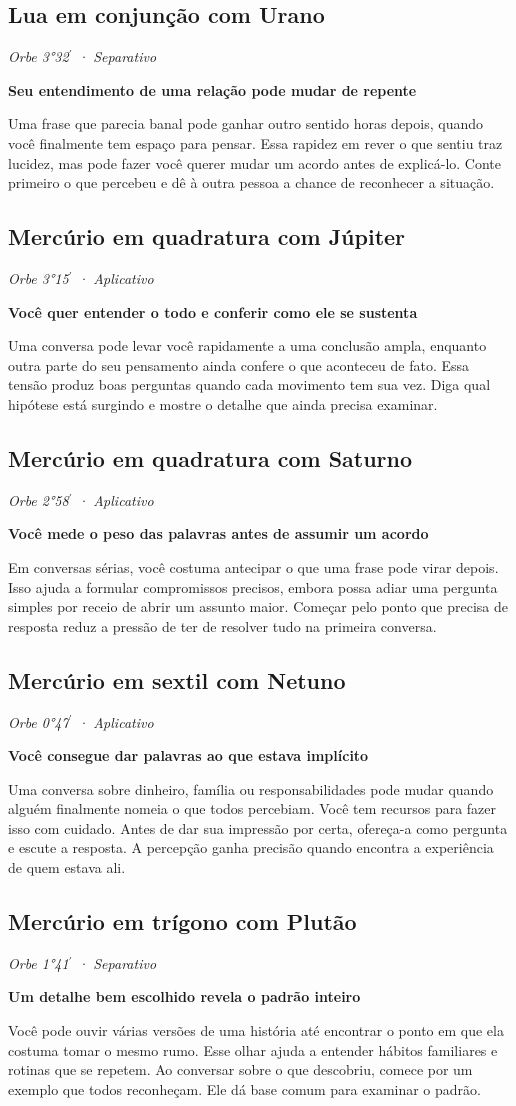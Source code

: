 \documentclass[11pt,a4paper]{article}
\newcommand{\leitura}[3]{\subsection{#1}\textit{#2}\par #3}
\newcommand{\subtituloleitura}[1]{\textbf{#1}\par\nopagebreak[4]}
\begin{document}
\leitura{Lua em conjunção com Urano}{Orbe 3°32\ensuremath{^{\prime}} · Separativo}{
\subtituloleitura{Seu entendimento de uma relação pode mudar de repente}
Uma frase que parecia banal pode ganhar outro sentido horas depois, quando você finalmente tem espaço para pensar. Essa rapidez em rever o que sentiu traz lucidez, mas pode fazer você querer mudar um acordo antes de explicá-lo. Conte primeiro o que percebeu e dê à outra pessoa a chance de reconhecer a situação.
}

\leitura{Mercúrio em quadratura com Júpiter}{Orbe 3°15\ensuremath{^{\prime}} · Aplicativo}{
\label{aspecto:mercurio-jupiter}\subtituloleitura{Você quer entender o todo e conferir como ele se sustenta}
Uma conversa pode levar você rapidamente a uma conclusão ampla, enquanto outra parte do seu pensamento ainda confere o que aconteceu de fato. Essa tensão produz boas perguntas quando cada movimento tem sua vez. Diga qual hipótese está surgindo e mostre o detalhe que ainda precisa examinar.
}

\leitura{Mercúrio em quadratura com Saturno}{Orbe 2°58\ensuremath{^{\prime}} · Aplicativo}{
\subtituloleitura{Você mede o peso das palavras antes de assumir um acordo}
Em conversas sérias, você costuma antecipar o que uma frase pode virar depois. Isso ajuda a formular compromissos precisos, embora possa adiar uma pergunta simples por receio de abrir um assunto maior. Começar pelo ponto que precisa de resposta reduz a pressão de ter de resolver tudo na primeira conversa.
}

\leitura{Mercúrio em sextil com Netuno}{Orbe 0°47\ensuremath{^{\prime}} · Aplicativo}{
\label{aspecto:mercurio-netuno}\subtituloleitura{Você consegue dar palavras ao que estava implícito}
Uma conversa sobre dinheiro, família ou responsabilidades pode mudar quando alguém finalmente nomeia o que todos percebiam. Você tem recursos para fazer isso com cuidado. Antes de dar sua impressão por certa, ofereça-a como pergunta e escute a resposta. A percepção ganha precisão quando encontra a experiência de quem estava ali.
}

\leitura{Mercúrio em trígono com Plutão}{Orbe 1°41\ensuremath{^{\prime}} · Separativo}{
\label{aspecto:mercurio-plutao}\subtituloleitura{Um detalhe bem escolhido revela o padrão inteiro}
Você pode ouvir várias versões de uma história até encontrar o ponto em que ela costuma tomar o mesmo rumo. Esse olhar ajuda a entender hábitos familiares e rotinas que se repetem. Ao conversar sobre o que descobriu, comece por um exemplo que todos reconheçam. Ele dá base comum para examinar o padrão.
}
\end{document}
